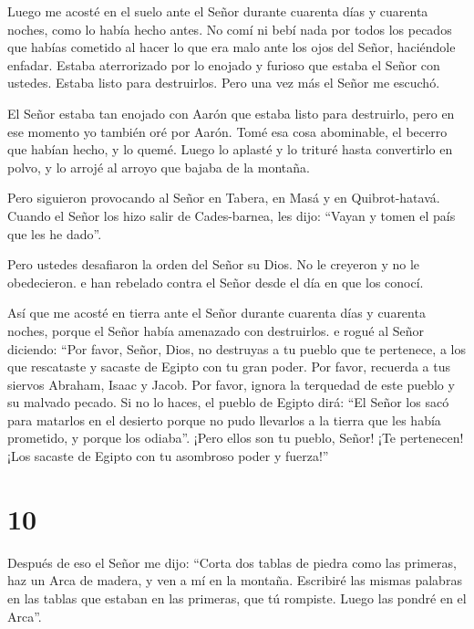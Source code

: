  Luego me acosté en el suelo ante el Señor durante cuarenta
días y cuarenta noches, como lo había hecho antes. No comí ni bebí nada
por todos los pecados que habías cometido al hacer lo que era malo ante
los ojos del Señor, haciéndole enfadar.  Estaba
aterrorizado por lo enojado y furioso que estaba el Señor con ustedes.
Estaba listo para destruirlos. Pero una vez más el Señor me escuchó.

 El Señor estaba tan enojado con Aarón que estaba listo
para destruirlo, pero en ese momento yo también oré por Aarón.
 Tomé esa cosa abominable, el becerro que habían hecho, y
lo quemé. Luego lo aplasté y lo trituré hasta convertirlo en polvo, y lo
arrojé al arroyo que bajaba de la montaña.

 Pero siguieron provocando al Señor en Tabera, en Masá y en
Quibrot-hatavá.  Cuando el Señor los hizo salir de
Cades-barnea, les dijo: ``Vayan y tomen el país que les he dado''.

Pero ustedes desafiaron la orden del Señor su Dios. No le creyeron y no
le obedecieron.  e han rebelado contra el Señor desde el
día en que los conocí.

 Así que me acosté en tierra ante el Señor durante cuarenta
días y cuarenta noches, porque el Señor había amenazado con destruirlos.
 e rogué al Señor diciendo: ``Por favor, Señor, Dios, no
destruyas a tu pueblo que te pertenece, a los que rescataste y sacaste
de Egipto con tu gran poder.  Por favor, recuerda a tus
siervos Abraham, Isaac y Jacob. Por favor, ignora la terquedad de este
pueblo y su malvado pecado.  Si no lo haces, el pueblo de
Egipto dirá: ``El Señor los sacó para matarlos en el desierto porque no
pudo llevarlos a la tierra que les había prometido, y porque los
odiaba''.  ¡Pero ellos son tu pueblo, Señor! ¡Te
pertenecen! ¡Los sacaste de Egipto con tu asombroso poder y fuerza!''

\hypertarget{section-9}{%
\section{10}\label{section-9}}

 Después de eso el Señor me dijo: ``Corta dos tablas de
piedra como las primeras, haz un Arca de madera, y ven a mí en la
montaña.  Escribiré las mismas palabras en las tablas que
estaban en las primeras, que tú rompiste. Luego las pondré en el Arca''.

